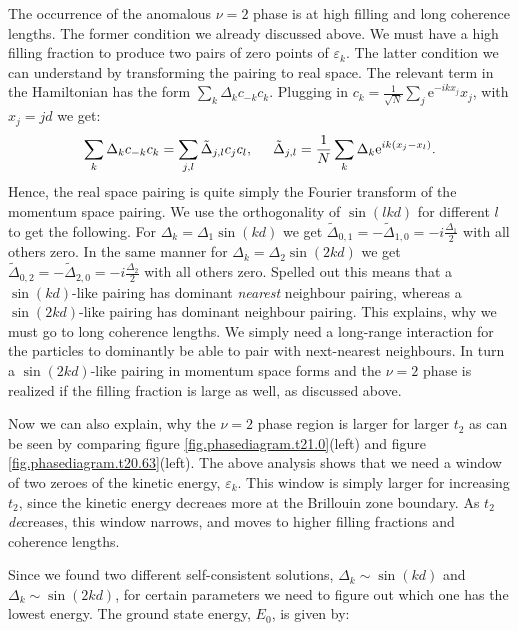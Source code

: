 The occurrence of the anomalous $\nu = 2$ phase is at high filling and long coherence lengths. The former condition we already discussed above. We must have a high filling fraction to produce two pairs of zero points of $\varepsilon_k$. The latter condition we can understand by transforming the pairing to real space. The relevant term in the Hamiltonian has the form $\sum_k \Delta_k c_{-k}c_{k}$. Plugging in $c_k = \frac{1}{\sqrt{N}}\sum_j \text{e}^{-ikx_j}x_j$, with $x_j = jd$ we get:
\begin{equation}
\sum_k \Delta_k c_{-k}c_{k} = \sum_{j,l} \tilde{\Delta}_{j,l}c_jc_l, \hspace{0.5cm} \tilde{\Delta}_{j,l} = \frac{1}{N}\sum_k\Delta_k\text{e}^{ik(x_j-x_l)}. \nonumber
\end{equation}
Hence, the real space pairing is quite simply the Fourier transform of the momentum space pairing. We use the orthogonality of $\sin(lkd)$ for different $l$ to get the following. For $\Delta_k = \Delta_1\sin(kd)$ we get $\tilde{\Delta}_{0,1} = -\tilde{\Delta}_{1,0} = -i\frac{\Delta_1}{2}$ with all others zero. In the same manner for $\Delta_k = \Delta_2\sin(2kd)$ we get $\tilde{\Delta}_{0,2} = -\tilde{\Delta}_{2,0} = -i\frac{\Delta_2}{2}$ with all others zero. Spelled out this means that a $\sin(kd)$-like pairing has dominant \textit{nearest} neighbour pairing, whereas a $\sin(2kd)$-like pairing has dominant  neighbour pairing. This explains, why we must go to long coherence lengths. We simply need a long-range interaction for the particles to dominantly be able to pair with next-nearest neighbours. In turn a $\sin(2kd)$-like pairing in momentum space forms and the $\nu = 2$ phase is realized if the filling fraction is large as well, as discussed above. 

Now we can also explain, why the $\nu = 2$ phase region is larger for larger $t_2$ as can be seen by comparing figure \ref{fig.phasediagram.t21.0}(left) and figure \ref{fig.phasediagram.t20.63}(left). The above analysis shows that we need a window of two zeroes of the kinetic energy, $\varepsilon_k$. This window is simply larger for increasing $t_2$, since the kinetic energy decreaes more at the Brillouin zone boundary. As $t_2$ \textit{de}creases, this window narrows, and moves to higher filling fractions and coherence lengths. 

Since we found two different self-consistent solutions, $\Delta_k \sim \sin(kd)$ and $\Delta_k \sim \sin(2kd)$, for certain parameters we need to figure out which one has the lowest energy. The ground state energy, $E_0$, is given by: 

